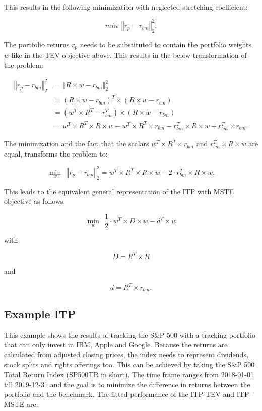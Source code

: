 \documentclass[
  oneside, a4paper, 12pt, openany]{book}
\theoremstyle{definition}
\theoremstyle{definition}
\theoremstyle{definition}
\theoremstyle{definition}
\theoremstyle{remark}
\begin{document}
This results in the following minimization with neglected stretching coefficient:

\[
 min \ \  \left\Vert r_{p}-r_{bm} \right\Vert_2^2.
\]

The portfolio returns \(r_p\) needs to be substituted to contain the portfolio weights \(w\) like in the TEV objective above. This results in the below transformation of the problem:

\begin{align*}
  \left\Vert r_{p}-r_{bm} \right\Vert_2^2 &= \left\Vert R \times w-r_{bm} \right\Vert_2^2 \\ 
  &= (R \times w-r_{bm})^T \times (R \times w-r_{bm}) \\ 
  &= (w^T \times R^T-r_{bm}^T) \times (R \times w-r_{bm}) \\ 
  &= w^T \times R^T \times R \times w - w^T \times R^T \times r_{bm} - r_{bm}^T \times R \times w + r_{bm}^T \times r_{bm}.
\end{align*}

The minimization and the fact that the scalars \(w^T \times R^T \times r_{bm}\) and \(r_{bm}^T \times R \times w\) are equal, transforms the problem to:

\[
  \min\limits_{w} \ \  \left\Vert r_{p}-r_{bm} \right\Vert_2^2 
  = w^T \times R^T \times R \times w - 2\cdot r_{bm}^T \times R \times w.
\]

This leads to the equivalent general representation of the ITP with MSTE objective as follows:

\[
  \min\limits_{w} \ \ \frac{1}{2} \cdot w^T \times D \times w - d^T \times w
\]

with

\[
D = R^T \times R
\]

and

\[
  d = R^T \times r_{bm}.
\]

\hypertarget{example-itp}{%
\subsection{Example ITP}\label{example-itp}}

This example shows the results of tracking the S\&P 500 with a tracking portfolio that can only invest in IBM, Apple and Google. Because the returns are calculated from adjusted closing prices, the index needs to represent dividends, stock splits and rights offerings too. This can be achieved by taking the S\&P 500 Total Return Index (SP500TR in short). The time frame ranges from 2018-01-01 till 2019-12-31 and the goal is to minimize the difference in returns between the portfolio and the benchmark. The fitted performance of the ITP-TEV and ITP-MSTE are:
\end{document}
